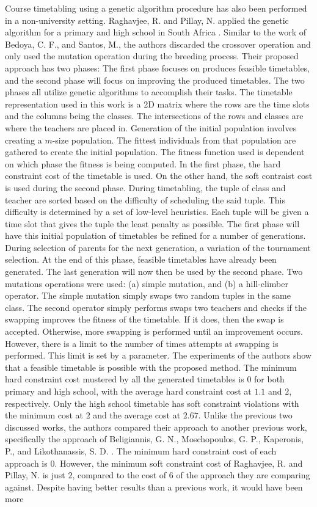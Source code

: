 Course timetabling using a genetic algorithm procedure has also been performed in a non-university setting. Raghavjee, R. and Pillay, N. applied the genetic algorithm for a primary and high school in South Africa \cite{raghavjee-ga-south-africa}. Similar to the work of Bedoya, C. F., and Santos, M., the authors discarded the crossover operation and only used the mutation operation during the breeding process. Their proposed approach has two phases: The first phase focuses on produces feasible timetables, and the second phase will focus on improving the produced timetables. The two phases all utilize genetic algorithms to accomplish their tasks. The timetable representation used in this work is a 2D matrix where the rows are the time slots and the columns being the classes. The intersections of the rows and classes are where the teachers are placed in. Generation of the initial population involves creating a $m$-size population. The fittest individuals from that population are gathered to create the initial population. The fitness function used is dependent on which phase the fitness is being computed. In the first phase, the hard constraint cost of the timetable is used. On the other hand, the soft contraist cost is used during the second phase. During timetabling, the tuple of class and teacher are sorted based on the difficulty of scheduling the said tuple. This difficulty is determined by a set of low-level heuristics. Each tuple will be given a time slot that gives the tuple the least penalty as possible. The first phase will have this initial population of timetables be refined for a number of generations. During selection of parents for the next generation, a variation of the tournament selection. At the end of this phase, feasible timetables have already been generated. The last generation will now then be used by the second phase. Two mutations operations were used: (a) simple mutation, and (b) a hill-climber operator. The simple mutation simply swaps two random tuples in the same class. The second operator simply performs swaps two teachers and checks if the swapping improves the fitness of the timetable. If it does, then the swap is accepted. Otherwise, more swapping is performed until an improvement occurs. However, there is a limit to the number of times attempts at swapping is performed. This limit is set by a parameter. The experiments of the authors show that a feasible timetable is possible with the proposed method. The minimum hard constraint cost mustered by all the generated timetables is $0$ for both primary and high school, with the average hard constraint cost at $1.1$ and $2$, respectively. Only the high school timetable has soft constraint violations with the minimum cost at $2$ and the average cost at $2.67$. Unlike the previous two discussed works, the authors compared their approach to another previous work, specifically the approach of Beligiannis, G. N., Moschopoulos, G. P., Kaperonis, P., and Likothanassis, S. D. \cite{beligiannis-evolutionary-computation}. The minimum hard constraint cost of each approach is $0$. However, the minimum soft constraint cost of Raghavjee, R. and Pillay, N. is just $2$, compared to the cost of $6$ of the approach they are comparing against. Despite having better results than a previous work, it would have been more 